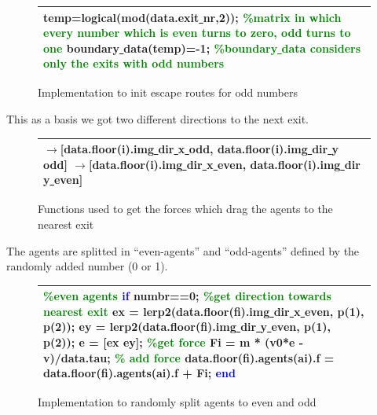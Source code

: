 \documentclass[11pt]{article}
\begin{document}
\begin{figure}[H]
\centering
\begin{tabular}
{|>{\large}m{\textwidth}|} \hline
\bigskip
temp=logical(mod(data.exit\underline{ }nr,2)); \textcolor{green}{\%matrix in which every number which is even turns to zero, odd turns to one}
\newline
boundary\underline{ }data(temp)=-1; \textcolor{green}{\%boundary\underline{ }data considers only the exits with odd numbers}
\bigskip
\\ \hline
\end{tabular}
\caption{Implementation to init escape routes for odd numbers}
\end{figure}

This as a basis we got two different directions to the next exit.

\begin{figure}[H]
\centering
\begin{tabular}
{|>{\large}m{\textwidth}|} \hline
\bigskip
$\rightarrow$[data.floor(i).img\underline{ }dir\underline{ }x\underline{ }odd, data.floor(i).img\underline{ }dir\underline{ }y\underline{ }odd]
\newline
$\rightarrow$[data.floor(i).img\underline{ }dir\underline{ }x\underline{ }even, data.floor(i).img\underline{ }dir\underline{ }y\underline{ }even]
\bigskip
\\ \hline
\end{tabular}
\caption{Functions used to get the forces which drag the agents to the nearest exit}
\end{figure}

The agents are splitted in “even-agents” and “odd-agents” defined by the randomly added number (0 or 1).

\begin{figure}[H]
\centering
\begin{tabular}
{|>{\large}m{\textwidth}|} \hline
\bigskip
\textcolor{green}{\%even agents}
\newline
\textcolor{blue}{if} numbr==0;
\newline
\textcolor{green}{\%get direction towards nearest exit}
\newline
ex = lerp2(data.floor(fi).img\underline{ }dir\underline{ }x\underline{ }even, p(1), p(2));
\newline
ey = lerp2(data.floor(fi).img\underline{ }dir\underline{ }y\underline{ }even, p(1), p(2));
\newline
e = [ex ey];
\newline
\textcolor{green}{\%get force}
\newline
Fi = m * (v0*e - v)/data.tau;
\newline
\textcolor{green}{\% add force}
\newline
data.floor(fi).agents(ai).f = data.floor(fi).agents(ai).f + Fi;
\newline
\textcolor{blue}{end}
\bigskip
\\ \hline
\end{tabular}
\caption{Implementation to randomly split agents to even and odd}
\end{figure}
\end{document}
